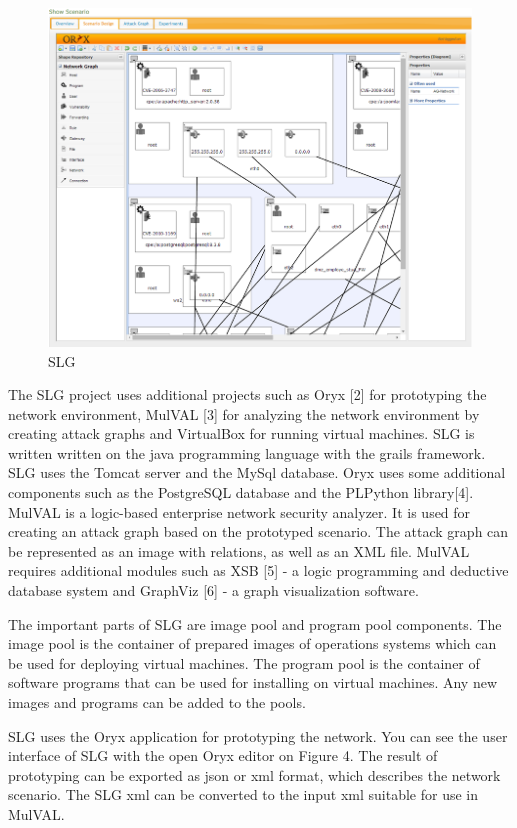 \begin{figure}[ht!]
\centering
\includegraphics[width=\textwidth]{slg.png}
\caption{SLG}
\label{overflow}
\end{figure} 

The SLG project uses additional projects such as Oryx [2] for prototyping the network environment, MulVAL [3] for analyzing the network environment by creating attack graphs and VirtualBox for running virtual machines. SLG is written written on the java programming language with the grails framework. SLG uses the Tomcat server and the MySql database. Oryx uses some additional components such as the PostgreSQL database and the PLPython library[4]. MulVAL is a logic-based enterprise network security analyzer. It is used for creating an attack graph based on the prototyped scenario. The attack graph can be represented as an image with relations, as well as an XML file. MulVAL requires additional modules such as XSB [5] - a logic programming and deductive database system and GraphViz [6] - a graph visualization software. 

The important parts of SLG are image pool and program pool components. The image pool is the container of prepared images of operations systems which can be used for deploying virtual machines. The program pool is the container of software programs that can be used for installing on virtual machines. Any new images and programs can be added to the pools.

SLG uses the Oryx application for prototyping the network. You can see the user interface of SLG with the open Oryx editor on Figure 4. The result of prototyping can be exported as json or xml format, which describes the network scenario. The SLG xml can be converted to the input xml suitable for use in MulVAL. 

